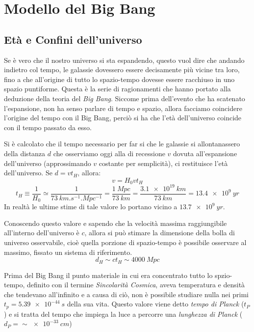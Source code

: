 \section{Modello del Big Bang}\label{sec:big-bang}
\subsection{Età e Confini dell'universo}\label{sec:eta-confini-universo}

Se è vero che il nostro universo si sta espandendo, questo vuol dire che andando indietro col tempo, le galassie dovessero essere decisamente più vicine tra loro, fino a che all'origine di tutto lo spazio-tempo dovesse essere racchiuso in uno spazio puntiforme. Questa è la serie di ragionamenti che hanno portato alla deduzione della teoria del \textit{Big Bang}. Siccome prima dell'evento che ha scatenato l'espansione, non ha senso parlare di tempo e spazio, allora facciamo coincidere l'origine del tempo con il Big Bang, perciò si ha che l'età dell'universo coincide con il tempo passato da esso.

Si è calcolato che il tempo necessario per far si che le galassie si allontanassero della distanza $d$ che osserviamo oggi alla di recessione $v$ dovuta all'espansione dell'universo (approssimando $v$ costante per semplicità), ci restituisce l'età dell'universo. Se $d = v t_H$, allora:
\[
    v = H_0 v t_H
\]
\begin{equation} \label{eq:eta-universo}
    t_H \equiv \frac{1}{H_0} \simeq \frac{1}{\SI{73}{km.s^{-1}.Mpc^{-1}}} = \frac{\SI{1}{Mpc}}{\SI{73}{km}} = \frac{\SI{3.1e19}{km}}{\SI{73}{km}} = \SI{13.4e9}{yr}
\end{equation}
In realtà le ultime stime di tale valore lo portano vicino a $\SI{13.7e9}{yr}$.

Conoscendo questo valore e sapendo che la velocità massima raggiungibile all'interno dell'universo è $c$, allora si può stimare la dimensione della bolla di universo osservabile, cioè quella porzione di spazio-tempo è possibile osservare al massimo, fissato un sistema di riferimento.
\[
    d_H \sim c t_H \sim \SI{4000}{Mpc}
\]

Prima del Big Bang il punto materiale in cui era concentrato tutto lo spzio-tempo, definito con il termine \textit{Sincolarità Cosmica}, aveva temperatura e densità che tendevano all'infinito e a causa di ciò, non è possibile studiare nulla nei primi $t_p = \SI{5.39e-44}{s}$ della sua vita. Questo valore viene detto \textit{tempo di Planck} ($t_P$) e si tratta del tempo che impiega la luce a percorre una \textit{lunghezza di Planck} ($d_P = \sim \SI{e-33}{cm}$)


